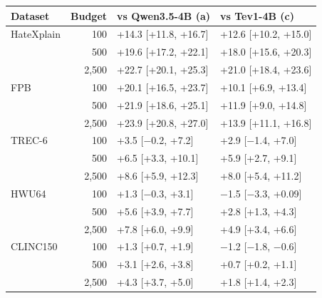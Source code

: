 \begin{tabular}{lrll}
\toprule
Dataset & Budget & vs Qwen3.5-4B (a) & vs Tev1-4B (c) \\
\midrule
HateXplain & 100 & +14.3 [+11.8, +16.7] & +12.6 [+10.2, +15.0] \\
 & 500 & +19.6 [+17.2, +22.1] & +18.0 [+15.6, +20.3] \\
 & 2{,}500 & +22.7 [+20.1, +25.3] & +21.0 [+18.4, +23.6] \\
\midrule
FPB & 100 & +20.1 [+16.5, +23.7] & +10.1 [+6.9, +13.4] \\
 & 500 & +21.9 [+18.6, +25.1] & +11.9 [+9.0, +14.8] \\
 & 2{,}500 & +23.9 [+20.8, +27.0] & +13.9 [+11.1, +16.8] \\
\midrule
TREC-6 & 100 & +3.5 [$-$0.2, +7.2] & +2.9 [$-$1.4, +7.0] \\
 & 500 & +6.5 [+3.3, +10.1] & +5.9 [+2.7, +9.1] \\
 & 2{,}500 & +8.6 [+5.9, +12.3] & +8.0 [+5.4, +11.2] \\
\midrule
HWU64 & 100 & +1.3 [$-$0.3, +3.1] & $-$1.5 [$-$3.3, +0.09] \\
 & 500 & +5.6 [+3.9, +7.7] & +2.8 [+1.3, +4.3] \\
 & 2{,}500 & +7.8 [+6.0, +9.9] & +4.9 [+3.4, +6.6] \\
\midrule
CLINC150 & 100 & +1.3 [+0.7, +1.9] & $-$1.2 [$-$1.8, $-$0.6] \\
 & 500 & +3.1 [+2.6, +3.8] & +0.7 [+0.2, +1.1] \\
 & 2{,}500 & +4.3 [+3.7, +5.0] & +1.8 [+1.4, +2.3] \\
\bottomrule
\end{tabular}
